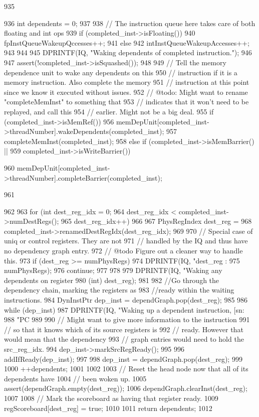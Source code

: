 \begin{DoxyCode}
935 {
936     int dependents = 0;
937 
938     // The instruction queue here takes care of both floating and int ops
939     if (completed_inst->isFloating()) {
940         fpInstQueueWakeupQccesses++;
941     } else {
942         intInstQueueWakeupAccesses++;
943     }
944 
945     DPRINTF(IQ, "Waking dependents of completed instruction.\n");
946 
947     assert(!completed_inst->isSquashed());
948 
949     // Tell the memory dependence unit to wake any dependents on this
950     // instruction if it is a memory instruction.  Also complete the memory
951     // instruction at this point since we know it executed without issues.
952     // @todo: Might want to rename "completeMemInst" to something that
953     // indicates that it won't need to be replayed, and call this
954     // earlier.  Might not be a big deal.
955     if (completed_inst->isMemRef()) {
956         memDepUnit[completed_inst->threadNumber].wakeDependents(completed_inst);
957         completeMemInst(completed_inst);
958     } else if (completed_inst->isMemBarrier() ||
959                completed_inst->isWriteBarrier()) {
960         memDepUnit[completed_inst->threadNumber].completeBarrier(completed_inst);
      
961     }
962 
963     for (int dest_reg_idx = 0;
964          dest_reg_idx < completed_inst->numDestRegs();
965          dest_reg_idx++)
966     {
967         PhysRegIndex dest_reg =
968             completed_inst->renamedDestRegIdx(dest_reg_idx);
969 
970         // Special case of uniq or control registers.  They are not
971         // handled by the IQ and thus have no dependency graph entry.
972         // @todo Figure out a cleaner way to handle this.
973         if (dest_reg >= numPhysRegs) {
974             DPRINTF(IQ, "dest_reg :%
975                     numPhysRegs);
976             continue;
977         }
978 
979         DPRINTF(IQ, "Waking any dependents on register %
980                 (int) dest_reg);
981 
982         //Go through the dependency chain, marking the registers as
983         //ready within the waiting instructions.
984         DynInstPtr dep_inst = dependGraph.pop(dest_reg);
985 
986         while (dep_inst) {
987             DPRINTF(IQ, "Waking up a dependent instruction, [sn:%
988                     "PC %
989 
990             // Might want to give more information to the instruction
991             // so that it knows which of its source registers is
992             // ready.  However that would mean that the dependency
993             // graph entries would need to hold the src_reg_idx.
994             dep_inst->markSrcRegReady();
995 
996             addIfReady(dep_inst);
997 
998             dep_inst = dependGraph.pop(dest_reg);
999 
1000             ++dependents;
1001         }
1002 
1003         // Reset the head node now that all of its dependents have
1004         // been woken up.
1005         assert(dependGraph.empty(dest_reg));
1006         dependGraph.clearInst(dest_reg);
1007 
1008         // Mark the scoreboard as having that register ready.
1009         regScoreboard[dest_reg] = true;
1010     }
1011     return dependents;
1012 }
\end{DoxyCode}


